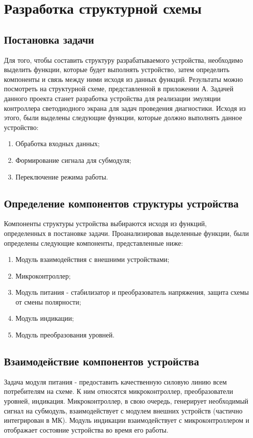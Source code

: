 \section{Разработка структурной схемы}
\label{sec:struct}

\subsection{Постановка задачи}

Для того, чтобы составить структуру разрабатываемого устройства, необходимо выделить функции, которые будет выполнять устройство, затем определить компоненты и связь между ними исходя из данных функций. Результаты можно посмотреть на структурной схеме, представленной в приложении А. 
Задачей данного проекта станет разработка устройства для реализации эмуляции контроллера светодиодного экрана для задач проведения диагностики. Исходя из этого, были выделены следующие функции, которые должно выполнять данное устройство: 
\begin{enumerate}
    \item Обработка входных данных;
    \item Формирование сигнала для субмодуля;
    \item Переключение режима работы.
\end{enumerate}

\subsection{Определение компонентов структуры устройства}

Компоненты структуры устройства выбираются исходя из функций, определенных в постановке задачи. Проанализировав выделенные функции, были определены следующие компоненты, представленные ниже:
\begin{enumerate}
    \item Модуль взаимодействия с внешними устройствами;
    \item Микроконтроллер;
    \item Модуль питания - стабилизатор и преобразователь напряжения, защита схемы от смены полярности;
    \item Модуль индикации;
    \item Модуль преобразования уровней.
\end{enumerate}

\subsection{Взаимодействие компонентов устройства}

Задача модуля питания - предоставить качественную силовую линию всем потребителям на схеме. К ним относятся микроконтроллер, преобразователи уровней, индикация. Микроконтроллер, в свою очередь, генерирует необходимый сигнал на субмодуль, взаимодействует с модулем внешних устройств (частично интегрирован в МК). Модуль индикации взаимодействует с микроконтроллером и отображает состояние устройства во время его работы.